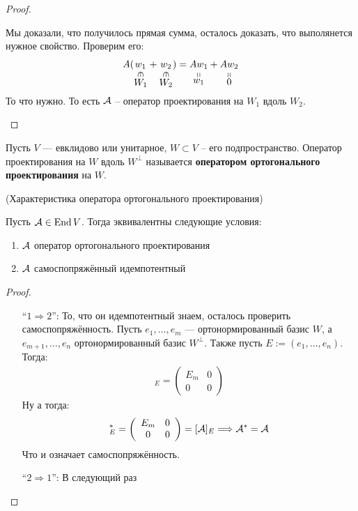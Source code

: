 \begin{theorem}
\begin{proof}
\begin{itemize}
                Мы доказали, что получилось прямая сумма, осталось доказать, что выполянется нужное свойство. Проверим его: 
                \begin{gather*}
                    A(\inbelow{w_1}{W_1}  + \inbelow{w_2}{W_2} ) = \stackbelow{A w_1}{w_1}  + \stackbelow{A w_2}{0}
                \end{gather*}
                То что нужно. То есть $\mathcal{A}$ -- оператор проектирования на $W_1$ вдоль $W_2$. 
        \end{itemize}
    \end{proof}
\end{theorem}

\begin{conj}
    Пусть $V$ --- евклидово или унитарное, $W \subset V$ -- его подпространство. 
    Оператор проектирования на $W$ вдоль $W^{\perp}$ называется \textbf{оператором ортогонального проектирования} на $W$.
\end{conj}

\begin{theorem} (Характеристика оператора ортогонального проектирования)

    Пусть $\mathcal{A} \in \operatorname{End}{V}$. 
    Тогда эквивалентны следующие условия:
    \begin{enumerate}
        \item $\mathcal{A}$ оператор ортогонального проектирования
        \item $\mathcal{A}$ самоспопряжённый идемпотентный
    \end{enumerate}

    \begin{proof} \quad 
    
    \begin{itemize}
        \item[``$1 \Rightarrow 2$'':]
            То, что он идемпотентный знаем, осталось проверить самоспопряжённость. 
            Пусть $e_1, \dots, e_m$ --- ортонормированный базис $W$, а $e_{m + 1}, \dots, e_n$ ортонормированный базис $W^{\perp}$.
            Также пусть $E := (e_1, \dots, e_n)$. Тогда:
            \begin{gather*}
                [\A]_E = \left(\begin{array}{cc}
                E_m & 0 \\ 
                0 & 0
                \end{array}\right)
            \end{gather*}
            Ну а тогда:    
            \begin{gather*}
                [\A]^*_E = \left(\begin{array}{cc}
                E_m & 0 \\ 
                0 & 0
                \end{array}\right) = [\A]_E \Longrightarrow \A^* = \A
            \end{gather*}
            Что и означает самоспопряжённость.
        \item[``$2 \Rightarrow 1$'':]  
            В следующий раз
    \end{itemize}
    \end{proof}
\end{theorem}

